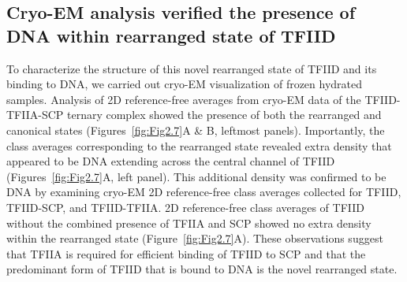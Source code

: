 \subsection{Cryo-EM analysis verified the presence of DNA within rearranged state of TFIID}
To characterize the structure of this novel rearranged state of TFIID and its binding to DNA, we carried out cryo-EM visualization of frozen hydrated samples. Analysis of 2D reference-free averages from cryo-EM data of the TFIID-TFIIA-SCP ternary complex showed the presence of both the rearranged and canonical states (Figures~\ref{fig:Fig2.7}A \& B, leftmost panels). Importantly, the class averages corresponding to the rearranged state revealed extra density that appeared to be DNA extending across the central channel of TFIID (Figures~\ref{fig:Fig2.7}A, left panel). This additional density was confirmed to be DNA by examining cryo-EM 2D reference-free class averages collected for TFIID, TFIID-SCP, and TFIID-TFIIA. 2D reference-free class averages of TFIID without the combined presence of TFIIA and SCP showed no extra density within the rearranged state (Figure~\ref{fig:Fig2.7}A). These observations suggest that TFIIA is required for efficient binding of TFIID to SCP and that the predominant form of TFIID that is bound to DNA is the novel rearranged state.

